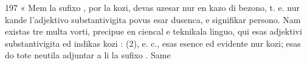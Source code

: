\begin{VUpage}[201]{197}
« Mem la sufixo , por la kozi, devas uzesar nur en\nl
kazo di bezono, t. e. nur kande l'adjektivo substantivigita\nl
povus esar dusenca, e signifikar persono. Nam existas tre\nl
multa vorti, precipue en ciencal e teknikala linguo, qui\nl
esas adjektivi substantivigita ed indikas kozi : \nl
{} (2), e. c., esas esence ed evidente nur\nl
kozi; esas do tote neutila adjuntar a li la sufixo . Same\parplein
\end{VUpage}

